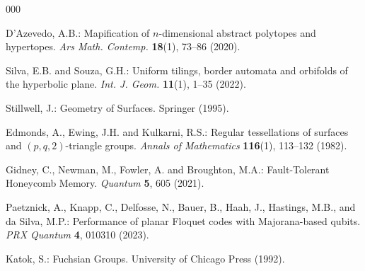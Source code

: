 \documentclass[%
reprint,
amsmath,amssymb,
aps,
]{revtex4-2}
\begin{document}
\begin{thebibliography}{000}
	
	D'Azevedo, A.B.: Mapification of $n$-dimensional abstract polytopes and hypertopes. {\em Ars Math. Contemp.} {\bf 18}(1), 73--86 (2020).
	
	Silva, E.B. and Souza, G.H.: Uniform tilings, border automata and orbifolds of the hyperbolic plane. {\em Int. J. Geom.} {\bf 11}(1), 1--35 (2022).
	
	Stillwell, J.: Geometry of Surfaces. Springer (1995).
	
	Edmonds, A., Ewing, J.H. and Kulkarni, R.S.: Regular tessellations of surfaces and $(p, q, 2)$-triangle groups. {\em Annals of Mathematics} {\bf 116}(1), 113--132 (1982).
	
	Gidney, C., Newman, M., Fowler, A. and Broughton, M.A.: Fault-Tolerant Honeycomb Memory. {\em Quantum} {\bf 5}, 605 (2021).
	
	Paetznick, A., Knapp, C., Delfosse, N., Bauer, B., Haah, J., Hastings, M.B., and da Silva, M.P.: Performance of planar Floquet codes with Majorana-based qubits. {\em PRX Quantum} {\bf 4}, 010310 (2023).
	
	Katok, S.: Fuchsian Groups. University of Chicago Press (1992).
	
\end{thebibliography}



		
	
\end{document}
